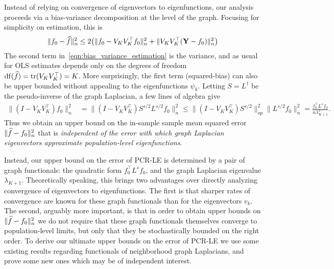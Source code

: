 Instead of relying on convergence of eigenvectors to eigenfunctions, our analysis proceeds via a bias-variance decomposition at the level of the graph. Focusing for simplicity on estimation, this is 
\begin{equation}
\label{eqn:bias_variance_estimation}
\|f_0 - \widehat{f}\|_n^2 \leq 2\bigl(\|f_0 - V_KV_K^{\top}f_0\|_n^2 + \|V_KV_K^{\top}({\bf Y} - f_0)\|_n^2\bigr) 
\end{equation}
The second term in~\eqref{eqn:bias_variance_estimation} is the variance, and as usual for OLS estimates depends only on the degrees of freedom $\mathrm{df}(\widehat{f}) = \mathrm{tr}(V_KV_K^{\top}) = K$. More surprisingly, the first term (squared-bias) can also be upper bounded without appealing to the eigenfunctions $\psi_k$. Letting $S = L^{\dagger}$ be the pseudo-inverse of the graph Laplacian, a few lines of algebra give
\begin{equation}
\label{eqn:bias_estimation}
\begin{aligned}
\|(I - V_KV_K^{\top})f_0\|_n^2 & = \|(I - V_KV_K^{\top})S^{s/2}L^{s/2}f_0\|_n^2 \leq \|(I - V_KV_K^{\top})S^{s/2}\|_{op}^2 \|L^{s/2}f_0\|_n^2 = \frac{f_0^{\top} L^s f_0}{n \lambda_{K + 1}^{s}}.
\end{aligned}
\end{equation}
Thus we obtain an upper bound on the in-sample sample mean squared error $\|\widehat{f} - f_0\|_n^2$ that is \emph{independent of the error with which graph Laplacian eigenvectors approximate population-level eigenfunctions}. 

Instead, our upper bound on the error of PCR-LE is determined by a pair of graph functionals: the quadratic form $f_0^{\top}L^s f_0$, and the graph Laplacian eigenvalue $\lambda_{K + 1}$. Theoretically speaking, this brings two advantages over directly analyzing convergence of eigenvectors to eigenfunctions. The first is that sharper rates  of convergence are known for these graph functionals than for the eigenvectors $v_k$. The second, arguably more important, is that in order to obtain upper bounds on $\|\widehat{f} - f_0\|_n^2$ we do not require that these graph functionals themselves converge to population-level limits, but only that they be stochastically bounded on the right order. To derive our ultimate upper bounds on the error of PCR-LE we use some existing results regarding functionals of neighborhood graph Laplacians, and prove some new ones which may be of independent interest. 

